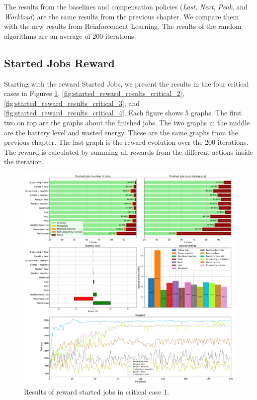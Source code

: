 The results from the baselines and compensation policies (\emph{Last}, \emph{Next}, \emph{Peak}, and \emph{Workload}) are the same results from the previous chapter. We compare them with the new results from Reinforcement Learning. The results of the random algorithms are an average of 200 iterations.

\subsection{Started Jobs Reward}

Starting with the reward Started Jobs, we present the results in the four critical cases in Figures \ref{fig:started_reward_results_critical_1}, \ref{fig:started_reward_results_critical_2}, \ref{fig:started_reward_results_critical_3}, and \ref{fig:started_reward_results_critical_4}. Each figure shows 5 graphs. The first two on top are the graphs about the finished jobs. The two graphs in the middle are the battery level and wasted energy. These are the same graphs from the previous chapter. The last graph is the reward evolution over the 200 iterations. The reward is calculated by summing all rewards from the different actions inside the iteration.

\begin{figure}[!htb]
    \centering
    \includegraphics[scale=0.29]{Images/Learning_compensations/reward_started_profile_best_workload_1_with_noise_state_delta.pdf}
    \caption{Results of reward started jobs in critical case 1.}
    \label{fig:started_reward_results_critical_1}
\end{figure}


